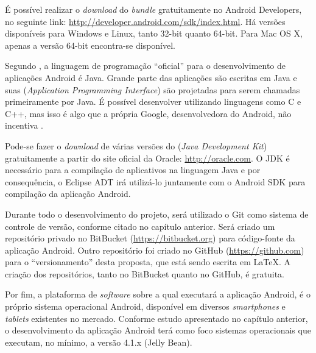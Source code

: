 É possível realizar o \textit{download} do \textit{bundle} gratuitamente no Android Developers, no seguinte link: \url{http://developer.android.com/sdk/index.html}. Há versões disponíveis para Windows e Linux, tanto 32-bit quanto 64-bit. Para Mac OS X, apenas a versão 64-bit encontra-se disponível.


Segundo , a linguagem de programação ``oficial'' para o desenvolvimento de aplicações Android é Java. Grande parte das aplicações são escritas em Java e suas  (\textit{Application Programming Interface}) são projetadas para serem chamadas primeiramente por Java. É possível desenvolver utilizando linguagens como C e C++, mas isso é algo que a própria Google, desenvolvedora do Android, não incentiva \cite{garySims}.

Pode-se fazer o \textit{download} de várias versões do  (\textit{Java Development Kit}) gratuitamente a partir do site oficial da Oracle: \url{http://oracle.com}. O JDK é necessário para a compilação de aplicativos na linguagem Java e por consequência, o Eclipse ADT irá utilizá-lo juntamente com o Android SDK para compilação da aplicação Android.

Durante todo o desenvolvimento do projeto, será utilizado o Git como sistema de controle de versão, conforme citado no capítulo anterior. Será criado um repositório privado no BitBucket (\url{https://bitbucket.org}) para código-fonte da aplicação Android. Outro repositório foi criado no GitHub (\url{https://github.com}) para o ``versionamento'' desta proposta, que está sendo escrita em LaTeX. A criação dos repositórios, tanto no BitBucket quanto no GitHub, é gratuita.

Por fim, a plataforma de \textit{software} sobre a qual executará a aplicação Android, é o próprio sistema operacional Android, disponível em diversos \textit{smartphones} e \textit{tablets} existentes no mercado. Conforme estudo apresentado no capítulo anterior, o desenvolvimento da aplicação Android terá como foco sistemas operacionais que executam, no mínimo, a versão 4.1.x (Jelly Bean).